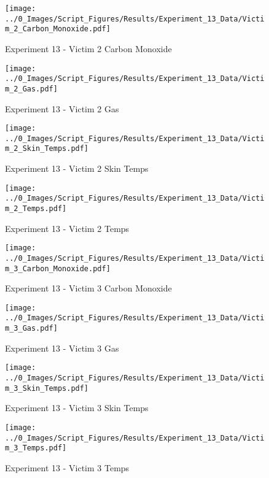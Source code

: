 	\clearpage

	\begin{figure}[H]
		\centering
		\texttt{[image: ../0\_Images/Script\_Figures/Results/Experiment\_13\_Data/Victim\_2\_Carbon\_Monoxide.pdf]}
		\caption[]{Experiment 13 - Victim 2 Carbon Monoxide}
	\end{figure}
 

	\begin{figure}[H]
		\centering
		\texttt{[image: ../0\_Images/Script\_Figures/Results/Experiment\_13\_Data/Victim\_2\_Gas.pdf]}
		\caption[]{Experiment 13 - Victim 2 Gas}
	\end{figure}
 
	\clearpage

	\begin{figure}[H]
		\centering
		\texttt{[image: ../0\_Images/Script\_Figures/Results/Experiment\_13\_Data/Victim\_2\_Skin\_Temps.pdf]}
		\caption[]{Experiment 13 - Victim 2 Skin Temps}
	\end{figure}
 

	\begin{figure}[H]
		\centering
		\texttt{[image: ../0\_Images/Script\_Figures/Results/Experiment\_13\_Data/Victim\_2\_Temps.pdf]}
		\caption[]{Experiment 13 - Victim 2 Temps}
	\end{figure}
 
	\clearpage

	\begin{figure}[H]
		\centering
		\texttt{[image: ../0\_Images/Script\_Figures/Results/Experiment\_13\_Data/Victim\_3\_Carbon\_Monoxide.pdf]}
		\caption[]{Experiment 13 - Victim 3 Carbon Monoxide}
	\end{figure}
 

	\begin{figure}[H]
		\centering
		\texttt{[image: ../0\_Images/Script\_Figures/Results/Experiment\_13\_Data/Victim\_3\_Gas.pdf]}
		\caption[]{Experiment 13 - Victim 3 Gas}
	\end{figure}
 
	\clearpage

	\begin{figure}[H]
		\centering
		\texttt{[image: ../0\_Images/Script\_Figures/Results/Experiment\_13\_Data/Victim\_3\_Skin\_Temps.pdf]}
		\caption[]{Experiment 13 - Victim 3 Skin Temps}
	\end{figure}
 

	\begin{figure}[H]
		\centering
		\texttt{[image: ../0\_Images/Script\_Figures/Results/Experiment\_13\_Data/Victim\_3\_Temps.pdf]}
		\caption[]{Experiment 13 - Victim 3 Temps}
	\end{figure}
 

